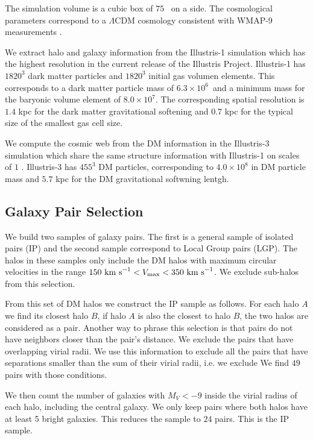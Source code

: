 \documentclass[useAMS,usenatbib,usegraphicx]{mn2e}
\newcommand{\hMpc}{{\ifmmode{h^{-1}{\rm Mpc}}\else{$h^{-1}$Mpc}\fi}}
\newcommand{\Mpc}{{\ifmmode{{\rm Mpc}}\else{Mpc}\fi}}
\newcommand{\Msun}{{\ifmmode{{\rm{M_{\odot}}}}\else{${\rm{M_{\odot}}}$}\fi}}
\newcommand{\kms}{{\ifmmode{{\rm{km\ s}^{-1}}}\else{km $\rm{s}^{-1}$}\fi}}
\begin{document}
The simulation volume is a cubic box of $75$ \hMpc\ on a side.
The cosmological parameters correspond to a $\Lambda$CDM cosmology
consistent with WMAP-9 measurements \citep{2013ApJS..208...19H}. 

We extract halo and galaxy information from the Illustris-1 simulation
which has the highest resolution in the current release of the
Illustris Project.
Illustris-1 has $1820^3$ dark matter particles and $1820^3$ initial gas
volumen elements. 
This corresponds to a dark matter particle mass of
$6.3\times 10^6$\Msun\ and a minimum mass for the baryonic volume
element of $8.0\times 10^7$\Msun. 
The corresponding spatial resolution is $1.4$ kpc for the dark matter
gravitational softening and $0.7$ kpc for the typical size of the
smallest gas cell size. 

We compute the cosmic web from the DM information in the
Illustris-3 simulation which share the same structure information with
Illustris-1 on scales of $1$ \Mpc.  
Illustris-3 has $455^3$ DM particles, corresponding to
$4.0\times 10^8$ \Msun in DM particle mass and $5.7$ kpc for the DM
gravitational softwning lentgh.
 

\subsection{Galaxy Pair Selection}

We build two samples of galaxy pairs. 
The first is a general sample of isolated pairs (IP) and the
second sample correspond to Local Group pairs (LGP).
The halos in these samples only include the DM halos with maximum
circular velocities in the range $ 150\ \kms <V_{\rm max}< 350\ \kms$. We
exclude sub-halos from this selection. 

From this set of DM halos we construct the IP sample as follows.
For each halo $A$ we find its closest halo $B$, if halo $A$ is also
the closest to halo $B$, the two halos are considered as a pair. 
Another way to phrase this selection is that pairs do not have
neighbors closer than the pair's distance.
We exclude the pairs that have overlapping virial radii. 
We use this information to exclude all the pairs that have separations
smaller than the sum of their virial radii, i.e. we exclude
We find $49$ pairs with those conditions.

We then count the number of galaxies with $M_V<-9$ inside the virial
radius of each halo, including the central galaxy.
We only keep pairs where both halos have at least 5 bright galaxies. 
This reduces the sample to $24$ pairs.  
This is the IP sample.
\end{document}
